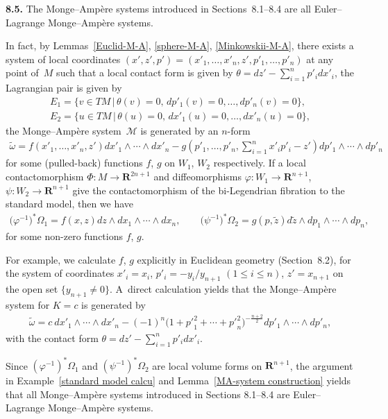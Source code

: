\documentclass[pdftex]{sigma}
\begin{document}
{\bf 8.5.}
The Monge--Amp{\`e}re systems introduced in
Sections~8.1--8.4
are all Euler--Lagrange Monge--Amp{\`e}re systems.

In fact, by Lemmas~\ref{Euclid-M-A}, \ref{sphere-M-A}, \ref{Minkowskii-M-A},
there exists a system of local coordinates
$(x', z', p') = (x'_1, \dots, x'_n, z', p'_1, \dots, p'_n)$
at any point of~$M$
such that a local contact form is given by
$\theta = dz' - \sum\limits_{i=1}^n p'_idx'_i$,
the Lagrangian pair is given by
\begin{gather*}
E_1   =    \{ v \in TM \,|\, \theta(v) = 0, \, dp'_1(v) = 0,
\dots, dp'_n(v) = 0 \},
\\
E_2  =  \{ u \in TM \,|\, \theta(u) = 0, \, dx'_1(u) = 0,
\dots, dx'_n(u) = 0 \},
\end{gather*}
the Monge--Amp{\`e}re system~${\mathcal M}$ is generated by
an $n$-form
\begin{gather*}
\tilde{\omega} =
f(x'_1, \dots, x'_n, z')dx'_1\wedge \cdots \wedge dx'_n -
g\left(p'_1, \dots, p'_n, \sum_{i=1}^n x'_ip'_i - z'\right)dp'_1\wedge \cdots
\wedge dp'_n
\end{gather*}
for some (pulled-back) functions $f$, $g$ on $W_1$, $W_2$ respectively.
If a local contactomorphism $\Phi \colon  M \to {\mathbf{R}}^{2n+1}$
and dif\/feomorphisms $\varphi \colon  W_1 \to {\mathbf{R}}^{n+1}$,
$\psi \colon  W_2 \to {\mathbf{R}}^{n+1}$ give the contactomorphism of
the bi-Legendrian f\/ibration to the standard model, then we have
\begin{gather*}
\big(\varphi^{-1}\big)^*\Omega_1 = f(x, z)dz \wedge dx_1 \wedge \cdots \wedge
dx_n,
\qquad
\big(\psi^{-1}\big)^*\Omega_2 = g(p, \tilde{z})d\tilde{z} \wedge dp_1
\wedge \cdots \wedge
dp_n,
\end{gather*}
for some non-zero functions $f$, $g$.

For example, we calculate $f$, $g$ explicitly in Euclidean geometry
(Section~8.2),
for the system of coordinates $x'_i = x_i$, $p'_i = - y_i/y_{n+1}$
$(1\leq i\leq n)$, $z' = x_{n+1}$ on the open set $\{ y_{n+1} \not= 0 \}$.
A~direct calculation yields
that the Monge--Amp{\`e}re system
for $K = c$ is generated by
\begin{gather*}
\tilde{\omega} = c \ dx'_1\wedge \cdots \wedge dx'_n
- (-1)^n\big(1 + {p'}_{1}^{2} + \cdots +
{p'}_{n}^{2}\big)^{-\frac{n+2}{2}}dp'_1\wedge \cdots \wedge dp'_n,
\end{gather*}
with the contact form $\theta = dz' - \sum\limits_{i=1}^n p'_idx'_i$.

Since $(\varphi^{-1})^*\Omega_1$ and $(\psi^{-1})^*\Omega_2$ are local volume forms
on ${\mathbf{R}}^{n+1}$, the argument in Example~\ref{standard model calcu} and Lemma~\ref{MA-system construction}
yields that
all Monge--Amp{\`e}re systems introduced in
Sections 8.1--8.4
are Euler--Lagrange Monge--Amp{\`e}re systems.
\end{document}
